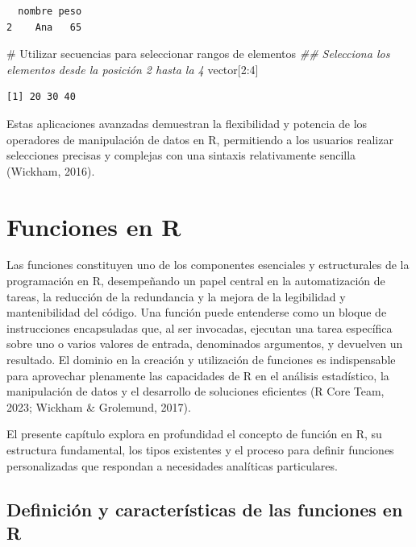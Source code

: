 \documentclass[
  spanish,
  a4paper,
  DIV=11,
  numbers=noendperiod,
  onepage,
  openany]{scrreprt}
\newenvironment{Shaded}{\begin{snugshade}}{\end{snugshade}}
\newcommand{\CommentTok}[1]{\textcolor[rgb]{0.37,0.37,0.37}{#1}}
\newcommand{\DecValTok}[1]{\textcolor[rgb]{0.68,0.00,0.00}{#1}}
\newcommand{\DocumentationTok}[1]{\textcolor[rgb]{0.37,0.37,0.37}{\textit{#1}}}
\newcommand{\NormalTok}[1]{\textcolor[rgb]{0.00,0.23,0.31}{#1}}
\newcommand{\SpecialCharTok}[1]{\textcolor[rgb]{0.37,0.37,0.37}{#1}}
\begin{document}
\begin{verbatim}
  nombre peso
2    Ana   65
\end{verbatim}

\begin{Shaded}
\begin{Highlighting}[]
\CommentTok{\# Utilizar secuencias para seleccionar rangos de elementos}
\DocumentationTok{\#\# Selecciona los elementos desde la posición 2 hasta la 4}
\NormalTok{vector[}\DecValTok{2}\SpecialCharTok{:}\DecValTok{4}\NormalTok{]   }
\end{Highlighting}
\end{Shaded}

\begin{verbatim}
[1] 20 30 40
\end{verbatim}

Estas aplicaciones avanzadas demuestran la flexibilidad y potencia de
los operadores de manipulación de datos en R, permitiendo a los usuarios
realizar selecciones precisas y complejas con una sintaxis relativamente
sencilla (Wickham, 2016).


\chapter{Funciones en R}\label{funciones-en-r}

Las funciones constituyen uno de los componentes esenciales y
estructurales de la programación en R, desempeñando un papel central en
la automatización de tareas, la reducción de la redundancia y la mejora
de la legibilidad y mantenibilidad del código. Una función puede
entenderse como un bloque de instrucciones encapsuladas que, al ser
invocadas, ejecutan una tarea específica sobre uno o varios valores de
entrada, denominados argumentos, y devuelven un resultado. El dominio en
la creación y utilización de funciones es indispensable para aprovechar
plenamente las capacidades de R en el análisis estadístico, la
manipulación de datos y el desarrollo de soluciones eficientes (R Core
Team, 2023; Wickham \& Grolemund, 2017).

El presente capítulo explora en profundidad el concepto de función en R,
su estructura fundamental, los tipos existentes y el proceso para
definir funciones personalizadas que respondan a necesidades analíticas
particulares.

\section{Definición y características de las funciones en
R}\label{definiciuxf3n-y-caracteruxedsticas-de-las-funciones-en-r}
\end{document}
